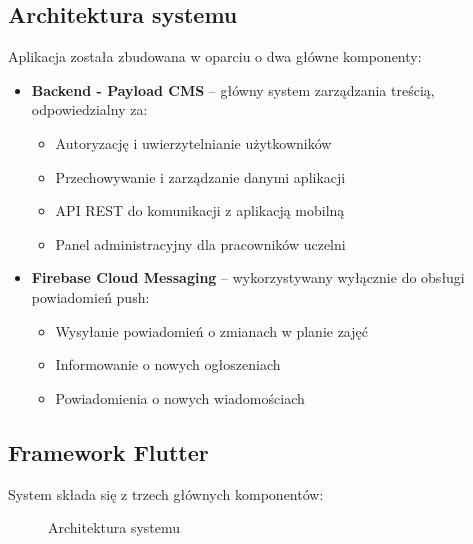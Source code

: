 \subsection{Architektura systemu}

Aplikacja została zbudowana w oparciu o dwa główne komponenty:

\begin{itemize}
  \item \textbf{Backend - Payload CMS} – główny system zarządzania treścią, odpowiedzialny za:
    \begin{itemize}
      \item Autoryzację i uwierzytelnianie użytkowników
      \item Przechowywanie i zarządzanie danymi aplikacji
      \item API REST do komunikacji z aplikacją mobilną
      \item Panel administracyjny dla pracowników uczelni
    \end{itemize}
  
  \item \textbf{Firebase Cloud Messaging} – wykorzystywany wyłącznie do obsługi powiadomień push:
    \begin{itemize}
      \item Wysyłanie powiadomień o zmianach w planie zajęć
      \item Informowanie o nowych ogłoszeniach
      \item Powiadomienia o nowych wiadomościach
    \end{itemize}
\end{itemize}

\subsection{Framework Flutter}
System składa się z trzech głównych komponentów:

\begin{figure}[h]
\centering
{}
\caption{Architektura systemu}
\label{fig:architecture}
\end{figure}
\newpage
